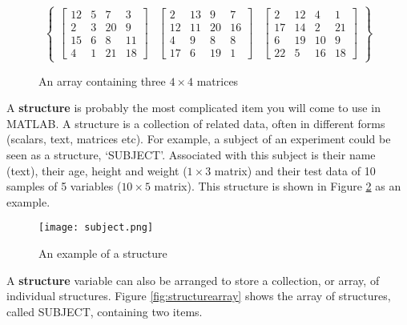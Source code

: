 \documentclass[12pt,a4paper]{article}
\begin{document}
{\begin{figure}[H]
	\[ \left\lbrace 
		\begin{array}{ccc}
		\left[ \begin{array}{cccc}
			12 & 5 & 7 & 3 \\
			2 & 3 & 20 & 9 \\
			15 & 6 & 8 & 11 \\
			4 & 1 & 21 & 18 \end{array} \right] &
		\left[ \begin{array}{cccc}
			2 & 13 & 9 & 7 \\
			12 & 11 & 20 & 16 \\
			4 & 9 & 8 & 8 \\
			17 & 6 & 19 & 1 \end{array} \right] &
		\left[ \begin{array}{cccc}
			2 & 12 & 4 & 1 \\
			17 & 14 & 2 & 21 \\
			6 & 19 & 10 & 9 \\
			22 & 5 & 16 & 18 \end{array} \right]
 		\end{array}
 	\right\rbrace \]
	\caption{An array containing three $4 \times 4$ matrices}
	\label{fig:matrixarray}
\end{figure}

A \textbf{structure} is probably the most complicated item you will come to use in MATLAB.  
A structure is a collection of related data, often in different forms (scalars, text, matrices etc).  
For example, a subject of an experiment could be seen as a structure, `SUBJECT'.  
Associated with this subject is their name (text), their age, height and weight ($1\times3$ matrix) and their test data of 10 samples of 5 variables ($10\times5$ matrix).  
This structure is shown in Figure \ref{fig:structure} as an example.  

\begin{figure}[H]
    \begin{center}
        \texttt{[image: subject.png]}
        \caption{An example of a structure}
        \label{fig:structure}
    \end{center}
\end{figure}

A \textbf{structure} variable can also be arranged to store a collection, or array, of individual structures.   
Figure \ref{fig:structurearray} shows the array of structures, called SUBJECT, containing two items.

}
\end{document}
